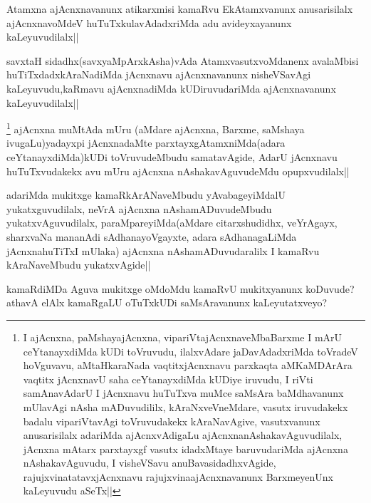 \begin{artha}
Atamxna ajAcnxnavanunx atikarxmisi kamaRvu EkAtamxvanunx anusarisilalx ajAcnxnavoMdeV huTuTxkulavAdadxriMda adu avideyxayanunx kaLeyuvudilalx||
\end{artha}

\begin{artha}
savxtaH sidadhx(savxyaMpArxkAsha)vAda AtamxvasutxvoMdanenx avalaMbisi huTiTxdadxkAraNadiMda jAcnxnavu ajAcnxnavanunx nisheVSavAgi kaLeyuvudu,kaRmavu ajAcnxnadiMda kUDiruvudariMda ajAcnxnavanunx kaLeyuvudilalx||
\end{artha}

\begin{artha}
\footnote{I ajAcnxna, paMshayajAcnxna, vipariVtajAcnxnaveMbaBarxme I mArU ceYtanayxdiMda kUDi toVruvudu, ilalxvAdare jaDavAdadxriMda toVradeV hoVguvavu, aMtaHkaraNada vaqtitxjAcnxnavu parxkaqta aMKaMDArAra vaqtitx jAcnxnavU saha ceYtanayxdiMda kUDiye iruvudu, I riVti samAnavAdarU I jAcnxnavu huTuTxva muMce saMsAra baMdhavanunx mUlavAgi nAsha mADuvudililx, kAraNxveVneMdare, vasutx iruvudakekx badalu vipariVtavAgi toVruvudakekx kAraNavAgive, vasutxvanunx anusarisilalx adariMda ajAcnxvAdigaLu ajAcnxnanAshakavAguvudilalx, jAcnxna  mAtarx parxtayxgf vasutx idadxMtaye baruvudariMda ajAcnxna nAshakavAguvudu, I visheVSavu anuBavasidadhxvAgide, rajujxvinatatavxjAcnxnavu rajujxvinaajAcnxnavanunx BarxmeyenUnx kaLeyuvudu aSeTx||} ajAcnxna muMtAda mUru (aMdare ajAcnxna, Barxme, saMshaya ivugaLu)yadayxpi jAcnxnadaMte parxtayxgAtamxniMda(adara ceYtanayxdiMda)kUDi toVruvudeMbudu samatavAgide, AdarU jAcnxnavu huTuTxvudakekx avu mUru ajAcnxna nAshakavAguvudeMdu opupxvudilalx||
\end{artha}

\begin{artha}
adariMda mukitxge kamaRkArANaveMbudu yAvabageyiMdalU yukatxguvudilalx, neVrA ajAcnxna nAshamADuvudeMbudu yukatxvAguvudilalx, paraMpareyiMda(aMdare citarxshudidhx, veYrAgayx, sharxvaNa mananAdi sAdhanayoVgayxte, adara sAdhanagaLiMda jAcnxnahuTiTxI mUlaka) ajAcnxna nAshamADuvudaralilx I kamaRvu kAraNaveMbudu yukatxvAgide||
\end{artha}


\begin{artha}
kamaRdiMDa Aguva mukitxge oMdoMdu kamaRvU mukitxyanunx koDuvude? athavA elAlx kamaRgaLU oTuTxkUDi saMsAravanunx kaLeyutatxveyo?
\end{artha}

